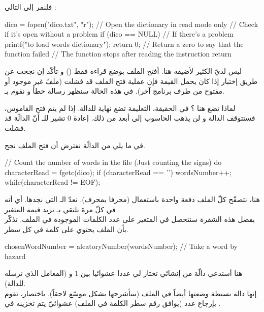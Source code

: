 فلنمر إلى التالي :

\begin{Csource}
dico = fopen("dico.txt", "r"); // Open the dictionary in read mode only
// Check if it's open without a problem
if (dico == NULL) // If there's a problem
{
  printf("\nImpossible to load words dictionary");
  return 0; // Return a zero to say that the function failed
  // The function stops after reading the instruction return
}
\end{Csource}

ليس لديّ الكثير لأضيفه هنا. أفتح الملف
بوضع قراءة فقط
()
و تأكّد إن نجحت عن طريق إختبار إذا كان
يحمل القيمة
فإن عملية فتح الملف قد فشلت (ملفّ غير موجود أو مفتوح من طرف برنامج آخر). في هذه الحالة سنظهر رسالة خطأ و نقوم بـ.

لماذا تضع
هنا ؟ في الحقيقة، التعليمة
تضع نهاية للدالة. إذا لم يتم فتح القاموس، فستتوقف الدالة و لن يذهب الحاسوب إلى أبعد من ذلك. إعادة 0 تشير للـ
أنّ الدالّة قد فشلت.

في ما يلي من الدالّة نفترض أن فتح الملف نجح.

\begin{Csource}
// Count the number of words in the file (Just counting the \n signs)
do
{
  characterRead = fgetc(dico);
  if (characterRead == '\n')
    wordsNumber++;
} while(characterRead != EOF);
\end{Csource}

هنا، نتصفّح كلّ الملف دفعة واحدة باستعمال
(محرفا بمحرف). نعدّ الـ
التي نجدها. أي أنه في كلّ مرة نلتقي بـ
نزيد قيمة المتغير
.\\
بفضل هذه الشفرة سنتحصل في المتغير
على عدد الكلمات الموجودة في الملف. تذكّر بأن الملف يحتوي على كلمة في كل سطر.

\begin{Csource}
chosenWordNumber = aleatoryNumber(wordsNumber); // Take a word by hazard
\end{Csource}

هنا أستدعي دالّة من إنشائي تختار لي عددا عشوائيا بين 1 و
(المعامل الذي ترسله للدالة).\\
إنها دالة بسيطة وضعتها أيضاً في الملف
(سأشرحها بشكل موسّع لاحقاً). باختصار، تقوم بإرجاع عدد (يوافق رقم سطر الكلمة في الملف) عشوائيّ يتم تخزينه في
.

